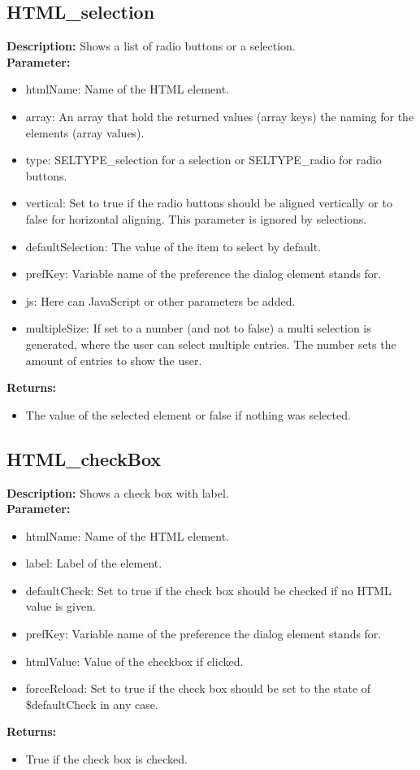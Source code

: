 \subsection{HTML\_selection}
\textbf{Description:} Shows a list of radio buttons or a selection.\\
\textbf{Parameter:}
\begin{itemize}
\item htmlName: Name of the HTML element.
\item array: An array that hold the returned values (array keys) the naming for the elements (array values).
\item type: SELTYPE\_selection for a selection or SELTYPE\_radio for radio buttons.
\item vertical: Set to true if the radio buttons should be aligned vertically or to false for horizontal aligning. This parameter is ignored by selections.
\item defaultSelection: The value of the item to select by default.
\item prefKey: Variable name of the preference the dialog element stands for.
\item js: Here can JavaScript or other parameters be added.
\item multipleSize: If set to a number (and not to false) a multi selection is generated, where the user can select multiple entries. The number sets the amount of entries to show the user.
\end{itemize}
\textbf{Returns:}
\begin{itemize}
\item The value of the selected element or false if nothing was selected.
\end{itemize}

\subsection{HTML\_checkBox}
\textbf{Description:} Shows a check box with label.\\
\textbf{Parameter:}
\begin{itemize}
\item htmlName: Name of the HTML element.
\item label: Label of the element.
\item defaultCheck: Set to true if the check box should be checked if no HTML value is given.
\item prefKey: Variable name of the preference the dialog element stands for.
\item htmlValue: Value of the checkbox if clicked.
\item forceReload: Set to true if the check box should be set to the state of \$defaultCheck in any case.
\end{itemize}
\textbf{Returns:}
\begin{itemize}
\item True if the check box is checked.
\end{itemize}


